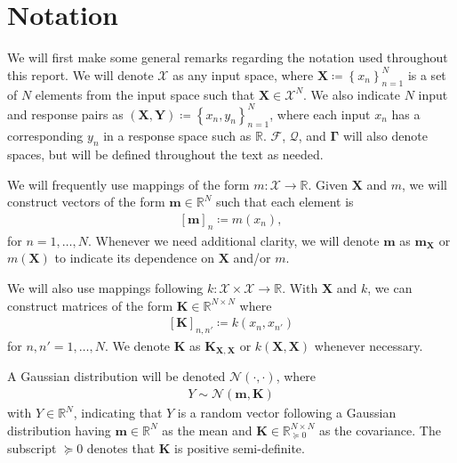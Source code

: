 \documentclass{article}
\numberwithin{equation}{section}
\begin{document}
\newpage
\section{Notation}
We will first make some general remarks regarding the notation used throughout this report. 
We will denote $\mathcal{X}$ as any input space, where $\mathbf{X} \coloneqq \left\{x_n\right\}_{n=1}^N$ is a set of $N$ elements from the input space such that $\mathbf{X} \in \mathcal{X}^N$.
We also indicate $N$ input and response pairs as $\left(\mathbf{X}, \mathbf{Y}\right) \coloneqq \left\{x_n, y_n\right\}_{n=1}^N$, where each input $x_n$ has a corresponding $y_n$ in a response space such as $\mathbb{R}$.
$\boldsymbol{\boldsymbol{\mathcal{F}}}$, $\boldsymbol{\mathcal{Q}}$, and $\boldsymbol{\Gamma}$ will also denote spaces, but will be defined throughout the text as needed.

We will frequently use mappings of the form $m: \mathcal{X} \rightarrow \mathbb{R}$. 
Given $\mathbf{X}$ and $m$, we will construct vectors of the form $\mathbf{m} \in \mathbb{R}^N$ such that each element is
\begin{align}
    \left[\mathbf{m}\right]_{n} \coloneqq m(x_n),
\end{align}
for $n=1,\dots, N$. Whenever we need additional clarity, we will denote $\mathbf{m}$ as $\mathbf{m}_{\mathbf{X}}$ or $m\left(\mathbf{X}\right)$ to indicate its dependence on $\mathbf{X}$ and/or $m$.

We will also use mappings following $k: \mathcal{X} \times \mathcal{X} \rightarrow \mathbb{R}$.
With $\mathbf{X}$ and $k$, we can construct matrices of the form $\mathbf{K} \in \mathbb{R}^{N\times N}$ where
\begin{align}
    \left[\mathbf{K}\right]_{n, n'} \coloneqq k(x_n, x_{n'})
\end{align}
for $n, n'=1,\dots,N$. 
We denote $\mathbf{K}$ as $\mathbf{K}_{\mathbf{X}, \mathbf{X}}$ or $k\left(\mathbf{X}, \mathbf{X}\right)$ whenever necessary.

A Gaussian distribution will be denoted $\mathcal{N}(\cdot, \cdot)$, where 
\begin{align}
    Y \sim \mathcal{N}(\mathbf{m}, \mathbf{K})
\end{align}
with $Y \in \mathbb{R}^N$, indicating that $Y$ is a random vector following a Gaussian distribution having $\mathbf{m} \in \mathbb{R}^N$ as the mean and $\mathbf{K} \in \mathbb{R}^{N \times N}_{\succcurlyeq 0}$ as the covariance. 
The subscript ${\succcurlyeq 0}$ denotes that $\mathbf{K}$ is positive semi-definite.
\end{document}
